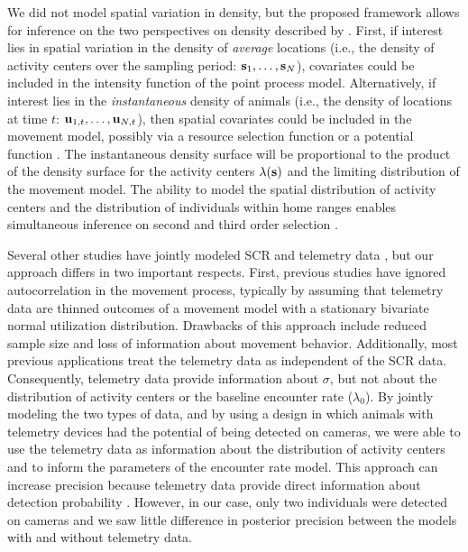 \documentclass[12pt]{article}
\newcommand{\bs}{{\bf s}}
\newcommand{\bu}{{\bf u}}
\begin{document}
We did not model spatial variation in density, but the proposed
framework allows for inference on the two perspectives on density
described by \citet[pg. 308]{royle_etal:2014}. First, if interest lies
in spatial variation in the density of \emph{average} locations (i.e., 
the density of activity centers over the sampling period: $\bs_1,
\dots, \bs_N$), covariates could be included in the intensity function
of the point process model. Alternatively, if interest lies in the
\emph{instantaneous} density of animals (i.e., the density of
locations at time $t$: $\bu_{1,t}, \dots, \bu_{N,t}$), then spatial
covariates could be included in the movement model, possibly via a
resource selection function
\citep{manly_etal:2002,johnson_etal:2008,forester_etal:2009,royle_etal:2013mee}
or a potential function
\citep{brillinger:2010,hooten_etal:2019}. The 
instantaneous density surface will be proportional to the product of
the density surface for the activity centers $\lambda(\bs)$ and the
limiting distribution of the movement model. 
The ability to model the spatial distribution of activity centers and
the distribution of individuals within home ranges enables
simultaneous inference on second and third order selection
\citep{johnson:1980,royle_etal:2013mee}.   


Several other studies have jointly modeled SCR and telemetry data
\citep{royle_etal:2013mee,whittington_etal:2018,linden_etal:2018},
but our approach differs in two important respects. First, previous
studies have ignored autocorrelation in the movement process,
typically by assuming that telemetry data are thinned outcomes of
a movement model with a stationary bivariate normal utilization
distribution. Drawbacks of this approach include reduced sample size
and loss of information about movement behavior.  Additionally, most
previous applications treat the telemetry data as independent of the
SCR data. Consequently, telemetry data provide information about
$\sigma$, but not about the distribution of activity centers or the
baseline encounter rate ($\lambda_0$). By 
jointly modeling the two types of data, and by using a design in which
animals with telemetry devices had the potential of being detected on
cameras, we were able to use the telemetry data as information about
the distribution of activity centers and to inform the parameters of
the encounter rate model. This approach can increase precision because
telemetry data provide direct information about detection probability
\citep{sollmann_etal:2013jae,sollmann_etal:2013ecol,murphy_etal:2019}.
However, in our case, only two individuals 
were detected on cameras and we saw little difference in posterior
precision between the models with and without telemetry data. %
\end{document}
